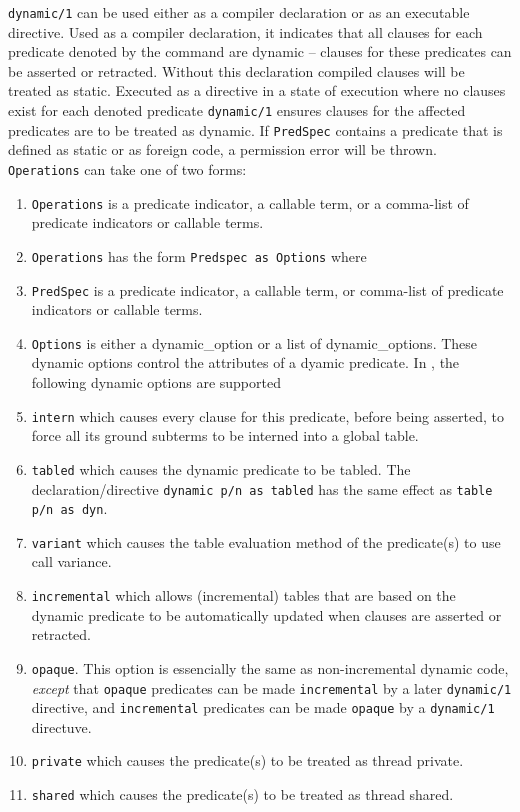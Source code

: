\begin{description}
\label{dynamic-declaration}
\label{dynamic/1}
%
{\tt dynamic/1} can be used either as a compiler declaration or as an
executable directive.  Used as a compiler declaration, it indicates
that all clauses for each predicate denoted by the command are dynamic
-- clauses for these predicates can be asserted or retracted.  Without
this declaration compiled clauses will be treated as static.  Executed
as a directive in a state of execution where no clauses exist for each
denoted predicate {\tt dynamic/1} ensures clauses for the affected
predicates are to be treated as dynamic. If {\tt PredSpec} contains a
predicate that is defined as static or as foreign code, a permission
error will be thrown.  {\tt Operations} can take one of two forms:
%

\begin{enumerate}
\item {\tt Operations} is a predicate indicator, a callable term, or a
  comma-list of predicate indicators or callable terms.
%
\item {\tt Operations} has the form {\tt Predspec as Options} where
\bi
\item {\tt PredSpec} is a predicate indicator, a callable term, or
  comma-list of predicate indicators or callable terms.
%
\item {\tt Options} is either a dynamic\_option or a list of
  dynamic\_options.  These dynamic options control the attributes of a
  dyamic predicate.  In \version, the following dynamic options are
  supported 
%
\bi
\item{\tt intern} which causes every clause for this predicate, before 
being asserted, to force all its ground subterms to be interned into a 
global table.
%
\item{\tt tabled} which causes the dynamic predicate to be tabled.
  The declaration/directive {\tt dynamic p/n as tabled} has the same
  effect as {\tt table p/n as dyn}.
%
\item {\tt variant} which causes the table evaluation method of the
  predicate(s) to use call variance.
%
%
\item {\tt incremental} which allows (incremental) tables that are
  based on the dynamic predicate to be automatically updated when
  clauses are asserted or retracted.
%
\item {\tt opaque}. This option is essencially the same as
  non-incremental dynamic code, {\em except} that {\tt opaque}
  predicates can be made {\tt incremental} by a later {\tt dynamic/1}
  directive, and {\tt incremental} predicates can be made {\tt opaque}
  by a {\tt dynamic/1} directuve.
%
\item {\tt private} which causes the predicate(s) to be treated as
  thread private.
%
\item {\tt shared} which causes the predicate(s) to be treated as
  thread shared.
\ei
\ei
\end{enumerate}


\end{description}
